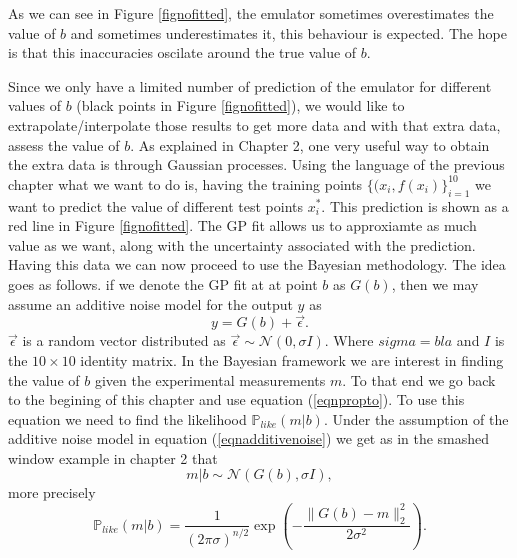 \documentclass[12pt]{book}
\newcommand{\like}{\mathbb{P}_{like}}
\begin{document}
As we can see in Figure \ref{fignofitted}, the emulator sometimes overestimates the value of $b$ and sometimes
underestimates it, this behaviour is expected. The hope is that this inaccuracies oscilate around the true
value of $b$.

Since we only have a limited number of prediction of the emulator for different values of $b$ (black points
in Figure \ref{fignofitted}), we would like to extrapolate/interpolate those results to get
more data and with that extra data, assess the value of $b$. As explained in Chapter 2, one very useful 
way to obtain the extra data is through Gaussian processes. Using the language of the previous chapter
what we want to do is, having the training points $\{(x_{i},f(x_{i})\}_{i=1}^{10}$ we want to predict 
the value of different test points $x_{i}^{*}$. This prediction is shown as a red line in Figure
\ref{fignofitted}.  The GP fit allows us to approxiamte as much value as we want, along with the uncertainty
associated with the prediction. Having this data we can now proceed to use the Bayesian methodology.
The idea goes as follows. if we denote the GP fit at at point $b$ as  $G(b)$, then we may assume
an additive noise model for the output $y$ as
\begin{equation}\label{eqnadditivenoise}
y=G(b)+\vec{\epsilon}.
\end{equation}
$\vec{\epsilon}$ is a random vector distributed as $\vec{\epsilon}\sim\mathscr{N}(0,\sigma I)$. Where $sigma=bla$
and $I$ is the $10\times 10$ identity matrix.
In the Bayesian framework we are interest in finding the value of $b$ given the experimental measurements $m$.
To that end we go back to the begining of this chapter and use equation (\ref{eqnpropto}). To use this equation
we need to find the likelihood $\like(m|b)$. Under the assumption of the additive noise model in equation
(\ref{eqnadditivenoise}) we get as in the smashed window example in chapter 2 that
\begin{equation*}
m|b\sim\mathscr{N}(G(b),\sigma I),
\end{equation*}
more precisely
\begin{equation*}
\like(m|b)=\frac{1}{(2\pi\sigma)^{n/2}}\exp\left(-\frac{\|G(b)-m\|_{2}^{2}}{2\sigma^{2}}\right).
\end{equation*}
\end{document}
